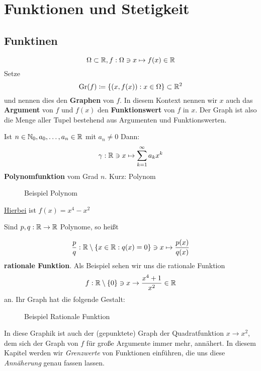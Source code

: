 \section{Funktionen und Stetigkeit}
\subsection{Funktinen}

\[
	\Omega \subset \mathbb{R} , f: \Omega \ni x \mapsto f(x) \in \mathbb{R} 
\]
Setze
\[
	\operatorname{Gr}(f) \coloneqq \{ (x, f(x)): x \in \Omega \} \subset \mathbb{R}^2
\]
und nennen dies den \textbf{Graphen} von $ f $. In diesem Kontext nennen wir $ x $ auch das \textbf{Argument} von $ f $ und $ f(x) $ den \textbf{Funktionswert} von $ f $ in $ x $. Der Graph ist also die Menge aller Tupel bestehend aus Argumenten und Funktionswerten.
\begin{subexample}[Polynomfunktionen]
	Ist $ n \in \mathbb{N}_0, a_0, \dotsc, a_n \in \mathbb{R}  $ mit $ a_n \neq  0 $ Dann:
	\[
		\gamma: \mathbb{R} \ni x \mapsto \sum_{k=1}^{\infty} a_k x^k 
	\]
	\textbf{Polynomfunktion} vom Grad $ n $. Kurz: Polynom
	\begin{figure}[H]
		\centering
		\caption{Beispiel Polynom}
		\label{Beispiel Polynom}
	\end{figure}
	\href{{Beispiel Polynom}}{Hierbei} ist $ f(x) = x^4 - x^2 $
\end{subexample}

\begin{subexample}
	Sind $ p, q: \mathbb{R} \to \mathbb{R}  $ Polynome, so heißt
	
	\[
		\frac{ p }{ q } : \mathbb{R} \setminus \{x \in \mathbb{R} :q(x) = 0\} \ni x \mapsto \frac{ p(x) }{ q(x) }
	\]
	\textbf{rationale Funktion}.
	Als Beispiel sehen wir uns die rationale Funktion
	\[
		f: \mathbb{R} \setminus \left\{ 0 \right\} \ni x \to \frac{x^4 + 1 }{ x^2 } \in \mathbb{R} 
	\]
	an. Ihr Graph hat die folgende Gestalt:
	\begin{figure}[H]
		\centering
		\caption{Beispiel Rationale Funktion}
		\label{Beispiel Rationale Funktion}
	\end{figure}
	In diese Graphik ist auch der (gepunktete) Graph der Quadratfunktion $ x \to x^2 $, dem sich der Graph von $ f $ für große Argumente immer mehr, annähert. In diesem Kapitel werden wir \textit{Grenzwerte} von Funktionen einführen, die uns diese \textit{Annäherung} genau fassen lassen.
\end{subexample}

